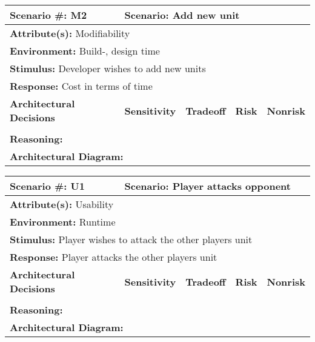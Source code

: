 \begin{tabular}{|m{}|m{}|m{}|m{}|m{}|m{}|}
  \hline
  {\bf Scenario \#:} M2 & \multicolumn{5}{m{0.75 \textwidth}|}{{\bf Scenario:} Add new unit} \\ \hline
  \multicolumn{6}{|m{0.9 \textwidth}|}{{\bf Attribute(s):} Modifiability} \\ \hline
  \multicolumn{6}{|m{0.9 \textwidth}|}{{\bf Environment:} Build-, design time} \\ \hline
  \multicolumn{6}{|m{0.9 \textwidth}|}{{\bf Stimulus:} Developer wishes to add new units} \\ \hline
  \multicolumn{6}{|m{0.9 \textwidth}|}{{\bf Response:} Cost in terms of time} \\ \hline
  \multicolumn{2}{|m{0.3 \textwidth}|}{\bf Architectural Decisions} & {\bf Sensitivity} & {\bf Tradeoff} & {\bf Risk} & {\bf Nonrisk} \\ \hline
  \multicolumn{2}{|m{0.3 \textwidth}|}{} &  &  &  &  \\ \hline
  \multicolumn{6}{|m{0.9 \textwidth}|}{{\bf Reasoning:} } \\ \hline
  \multicolumn{6}{|m{0.9 \textwidth}|}{{\bf Architectural Diagram:} } \\ \hline
\end{tabular}



\begin{tabular}{|m{}|m{}|m{}|m{}|m{}|m{}|}
  \hline
  {\bf Scenario \#:} U1 & \multicolumn{5}{m{0.75 \textwidth}|}{{\bf Scenario:} Player attacks opponent} \\ \hline
  \multicolumn{6}{|m{0.9 \textwidth}|}{{\bf Attribute(s):} Usability} \\ \hline
  \multicolumn{6}{|m{0.9 \textwidth}|}{{\bf Environment:} Runtime} \\ \hline
  \multicolumn{6}{|m{0.9 \textwidth}|}{{\bf Stimulus:} Player wishes to attack the other players unit} \\ \hline
  \multicolumn{6}{|m{0.9 \textwidth}|}{{\bf Response:} Player attacks the other players unit} \\ \hline
  \multicolumn{2}{|m{0.3 \textwidth}|}{\bf Architectural Decisions} & {\bf Sensitivity} & {\bf Tradeoff} & {\bf Risk} & {\bf Nonrisk} \\ \hline
  \multicolumn{2}{|m{0.3 \textwidth}|}{} &  &  &  &  \\ \hline
  \multicolumn{6}{|m{0.9 \textwidth}|}{{\bf Reasoning:} } \\ \hline
  \multicolumn{6}{|m{0.9 \textwidth}|}{{\bf Architectural Diagram:} } \\ \hline
\end{tabular}



